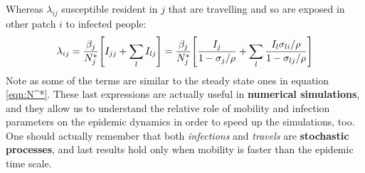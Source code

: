 \documentclass[../main/main.tex]{subfiles}
\begin{document}
Whereas $\lambda_{ij}$ susceptible resident in $j$ that are travelling and so are exposed in other patch $i$ to infected people:
\begin{equation}
    \lambda_{ij} = \frac{\beta_j}{N_j^*} \qty[ I_{jj} + \sum_l I_{lj} ] = \frac{\beta_j}{N_j^*} \qty[ \frac{I_j}{1-\sigma_j/\rho} + \sum_l \frac{I_l \sigma_{li}/\rho}{1-\sigma_{lj}/\rho} ]
    \label{eqn:lambda_ij}
\end{equation}
Note as some of the terms are similar to the steady state ones in equation \ref{eqn:N^*}. These last expressions are actually useful in \textbf{numerical simulations}, and they allow us to understand the relative role of mobility and infection parameters on the epidemic dynamics in order to speed up the simulations, too. One should actually remember that both \textit{infections} and \textit{travels} are \textbf{stochastic processes}, and last results hold only when mobility is faster than the epidemic time scale.
\end{document}
